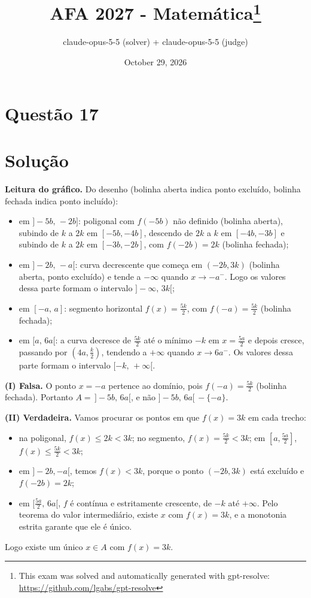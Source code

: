\documentclass{article}%
\title{AFA 2027 - Matemática\thanks{This exam was solved and automatically generated with gpt-resolve: \url{https://github.com/lgabs/gpt-resolve}}}%
\author{claude{-}opus{-}5{-}5 (solver) + claude{-}opus{-}5{-}5 (judge)}%
\date{October 29, 2026}%
\begin{document}
%
\normalsize%
\maketitle%
\section*{Questão 17}

\section*{Solução}

\textbf{Leitura do gráfico.} Do desenho (bolinha aberta indica ponto excluído, bolinha fechada indica ponto incluído):
\begin{itemize}
\item em $]-5b,\,-2b]$: poligonal com $f(-5b)$ não definido (bolinha aberta), subindo de $k$ a $2k$ em $[-5b,-4b]$, descendo de $2k$ a $k$ em $[-4b,-3b]$ e subindo de $k$ a $2k$ em $[-3b,-2b]$, com $f(-2b)=2k$ (bolinha fechada);
\item em $]-2b,\,-a[$: curva decrescente que começa em $(-2b,3k)$ (bolinha aberta, ponto excluído) e tende a $-\infty$ quando $x\to -a^{-}$. Logo os valores dessa parte formam o intervalo $]-\infty,\,3k[$;
\item em $[-a,\,a]$: segmento horizontal $f(x)=\tfrac{5k}{2}$, com $f(-a)=\tfrac{5k}{2}$ (bolinha fechada);
\item em $[a,\,6a[$: a curva decresce de $\tfrac{5k}{2}$ até o mínimo $-k$ em $x=\tfrac{5a}{2}$ e depois cresce, passando por $(4a,\tfrac k2)$, tendendo a $+\infty$ quando $x\to 6a^{-}$. Os valores dessa parte formam o intervalo $[-k,\,+\infty[$.
\end{itemize}

\textbf{(I) Falsa.} O ponto $x=-a$ pertence ao domínio, pois $f(-a)=\tfrac{5k}{2}$ (bolinha fechada). Portanto $A=\,]-5b,\,6a[$, e não $]-5b,\,6a[\,-\{-a\}$.

\textbf{(II) Verdadeira.} Vamos procurar os pontos em que $f(x)=3k$ em cada trecho:
\begin{itemize}
\item na poligonal, $f(x)\le 2k<3k$; no segmento, $f(x)=\tfrac{5k}{2}<3k$; em $[a,\tfrac{5a}{2}]$, $f(x)\le\tfrac{5k}{2}<3k$;
\item em $]-2b,-a[$, temos $f(x)<3k$, porque o ponto $(-2b,3k)$ está excluído e $f(-2b)=2k$;
\item em $[\tfrac{5a}{2},\,6a[$, $f$ é contínua e estritamente crescente, de $-k$ até $+\infty$. Pelo teorema do valor intermediário, existe $x$ com $f(x)=3k$, e a monotonia estrita garante que ele é único.
\end{itemize}
Logo existe um único $x\in A$ com $f(x)=3k$.
\end{document}
